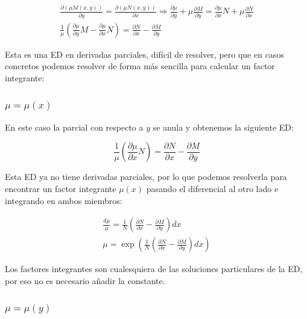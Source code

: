 \documentclass[a4paper,12pt,titlepage]{article}
\begin{document}
\begin{equation*}
    \begin{gathered}
    \frac{\partial (\mu M(x,y))}{\partial y} = \frac{\partial (\mu N(x,y))}{\partial x} \Rightarrow \frac{\partial \mu}{\partial y} + \mu \frac{\partial M}{\partial y} = \frac{\partial \mu}{\partial x} N +\mu \frac{\partial N}{\partial x} \\
    \frac{1}{\mu} \left (\frac{\partial \mu}{\partial y}M-\frac{\partial \mu}{\partial x}N\right ) = \frac{\partial N}{\partial x} - \frac{\partial M}{\partial y}
    \end{gathered}
\end{equation*}

Esta es una ED en derivadas parciales, difícil de resolver, pero que en casos concretos podemos resolver de forma más sencilla para calcular un factor integrante:

\subsubsection{$\mu = \mu(x)$}

En este caso la parcial con respecto a $y$ se anula y obtenemos la siguiente ED:

\begin{equation*}
    \frac{1}{\mu} \left (\frac{\partial \mu}{\partial x}N \right ) =\frac{\partial N}{\partial x} - \frac{\partial M}{\partial y}
\end{equation*}

Esta ED ya no tiene derivadas parciales, por lo que podemos resolverla para encontrar un factor integrante $\mu(x)$ pasando el diferencial al otro lado e integrando en ambos miembros:

\begin{equation*}
    \begin{gathered}
    \frac{d\mu}{\mu} = \frac{1}{N} \left (\frac{\partial N}{\partial x} - \frac{\partial M}{\partial y}\right ) dx \\
    \mu = \exp \left (\frac{1}{N} \left (\frac{\partial N}{\partial x} - \frac{\partial M}{\partial y}\right ) dx \right )
    \end{gathered}
\end{equation*}

Los factores integrantes son cualesquiera de las soluciones particulares de la ED, por eso no es necesario añadir la constante.

\subsubsection{$\mu = \mu(y)$}
\end{document}
